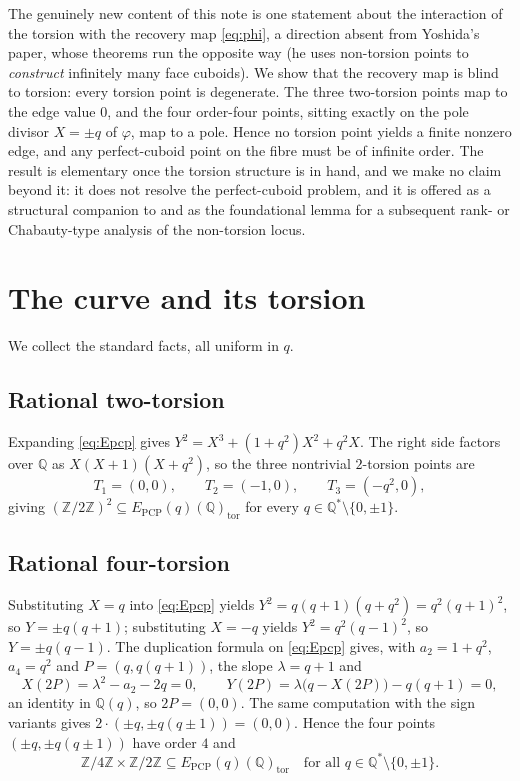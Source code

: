 \documentclass[11pt,reqno]{amsart}
\theoremstyle{plain}
\theoremstyle{definition}
\newcommand{\Q}{\mathbb{Q}}
\newcommand{\Z}{\mathbb{Z}}
\newcommand{\Epcp}{E_{\mathrm{PCP}}}
\begin{document}
The genuinely new content of this note is one statement about the interaction of the
torsion with the recovery map \eqref{eq:phi}, a direction absent from Yoshida's paper,
whose theorems run the opposite way (he uses non-torsion points to \emph{construct}
infinitely many face cuboids). We show that the recovery map is blind to torsion: every
torsion point is degenerate. The three two-torsion points map to the edge value $0$, and
the four order-four points, sitting exactly on the pole divisor $X=\pm q$ of $\varphi$,
map to a pole. Hence no torsion point yields a finite nonzero edge, and any
perfect-cuboid point on the fibre must be of infinite order. The result is elementary
once the torsion structure is in hand, and we make no claim beyond it: it does not
resolve the perfect-cuboid problem, and it is offered as a structural companion to
\cite{Yoshida} and as the foundational lemma for a subsequent rank- or Chabauty-type
analysis of the non-torsion locus.

\section{The curve and its torsion}

We collect the standard facts, all uniform in $q$.

\subsection{Rational two-torsion}
Expanding \eqref{eq:Epcp} gives $Y^{2}=X^{3}+(1+q^{2})X^{2}+q^{2}X$. The right side
factors over $\Q$ as $X(X+1)(X+q^{2})$, so the three nontrivial $2$-torsion points are
\begin{equation}\label{eq:2tors}
T_{1}=(0,0),\qquad T_{2}=(-1,0),\qquad T_{3}=(-q^{2},0),
\end{equation}
giving $(\Z/2\Z)^{2}\subseteq\Epcp(q)(\Q)_{\mathrm{tor}}$ for every
$q\in\Q^{\ast}\setminus\{0,\pm1\}$.

\subsection{Rational four-torsion}
Substituting $X=q$ into \eqref{eq:Epcp} yields $Y^{2}=q(q+1)(q+q^{2})=q^{2}(q+1)^{2}$, so
$Y=\pm q(q+1)$; substituting $X=-q$ yields $Y^{2}=q^{2}(q-1)^{2}$, so $Y=\pm q(q-1)$. The
duplication formula on \eqref{eq:Epcp} gives, with $a_{2}=1+q^{2}$, $a_{4}=q^{2}$ and
$P=(q,q(q+1))$, the slope $\lambda=q+1$ and
\begin{equation}\label{eq:double}
X(2P)=\lambda^{2}-a_{2}-2q=0,\qquad Y(2P)=\lambda\bigl(q-X(2P)\bigr)-q(q+1)=0,
\end{equation}
an identity in $\Q(q)$, so $2P=(0,0)$. The same computation with the sign variants gives
$2\cdot(\pm q,\pm q(q\pm1))=(0,0)$. Hence the four points $(\pm q,\pm q(q\pm1))$ have
order $4$ and
\begin{equation}\label{eq:contain}
\Z/4\Z\times\Z/2\Z\subseteq\Epcp(q)(\Q)_{\mathrm{tor}}
\quad\text{for all }q\in\Q^{\ast}\setminus\{0,\pm1\}.
\end{equation}
\end{document}
